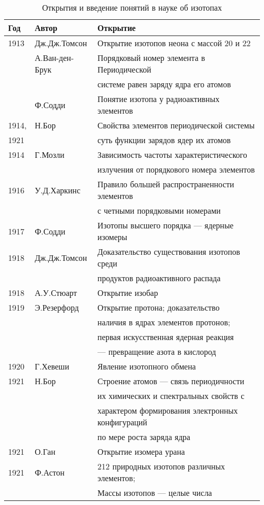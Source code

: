 \documentclass[a5paper,openany]{book}
\begin{document}
\begin{table}[h]
	{\small	
		\begin{tabular}{l|l|l}
			Год & Автор	& Открытие \\
			\hline
			1913 & Дж.Дж.Томсон & Открытие {\color{red}изотопов} неона с массой 20 и 22\\
			~ & А.Ван-ден-Брук & {\color{red}Порядковый номер элемента в Периодической}  \\
			~ & ~ &  {\color{red}системе равен заряду ядра его 	атомов} \\
			~ & Ф.Содди & Понятие изотопа у радиоактивных
			элементов   \\
			1914, & Н.Бор & Свойства элементов периодической системы  \\
			1921 & ~ & суть  функции зарядов ядер их атомов \\
			1914 & Г.Мозли & Зависимость  частоты характеристического	  \\
			~ & ~ & излучения от порядкового номера элементов \\
			1916 & У.Д.Харкинс & {\color{red}Правило большей распространенности элементов}\\
			~ & ~ & {\color{red}с четными порядковыми номерами} \\
			1917 & Ф.Содди  & Изотопы высшего порядка --- ядерные изомеры\\
			1918 & Дж.Дж.Томсон  &  Доказательство существования изотопов среди\\
			~ & ~ & продуктов радиоактивного распада \\
			1918 & А.У.Стюарт  &  Открытие {\color{red}изобар}\\
			1919 &Э.Резерфорд &   Открытие протона; доказательство  \\
			~ & ~ & наличия в ядрах элементов протонов; \\
			~ & ~ & первая искусственная ядерная реакция \\
			~ & ~ & --- превращение азота в кислород \\
			1920 & Г.Хевеши & Явление изотопного обмена\\
			1921 & Н.Бор & Строение атомов --- связь периодичности  \\
			~ & ~ & их химических и спектральных свойств с \\
			~ & ~ &  характером формирования электронных конфигураций \\
			~ & ~ &  по мере роста заряда ядра \\
			1921 & О.Ган  & Открытие изомера урана\\
			1921 & Ф.Астон  & {\color{red}212 природных изотопов различных элементов;} \\
			~ & ~ &   {\color{red}Массы изотопов --- целые числа} \\
			\hline
		\end{tabular}
	}	
\caption{Открытия и введение понятий в науке об изотопах}
\label{t:IsotopeHistory}
\end{table}
\end{document}
